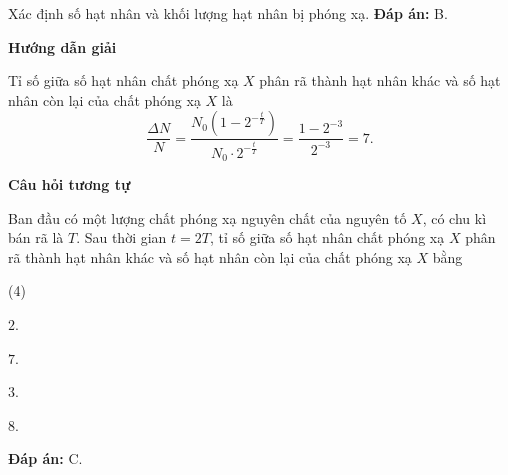 \begin{dang}{Xác định số hạt nhân và khối lượng hạt nhân bị phóng xạ.}
{		\textbf{Đáp án:} B.
	}
	{
		\begin{center}
			\textbf{Hướng dẫn giải}
		\end{center}
		
		Tỉ số giữa số hạt nhân chất phóng xạ $X$ phân rã thành hạt nhân khác và số hạt nhân còn lại của chất phóng xạ $X$ là
		\begin{equation*}
			\dfrac{\Delta N}{N}=\dfrac{N_0\left( 1-2^{-\frac{t}{T}}\right)}{N_0\cdot 2^{-\frac{t}{T}}}=\dfrac{1-2^{-3}}{2^{-3}}=7.
		\end{equation*}
		
		\begin{center}
			\textbf{Câu hỏi tương tự}
		\end{center}
		
		Ban đầu có một lượng chất phóng xạ nguyên chất của nguyên tố $X$, có chu kì bán rã là $T$. Sau thời gian $t=2T$, tỉ số giữa số hạt nhân chất phóng xạ $X$ phân rã thành hạt nhân khác và số hạt nhân còn lại của chất phóng xạ $X$ bằng
		\begin{mcq}(4)
			\item $2$.
			\item $7$.
			\item $3$.
			\item $8$.
		\end{mcq}
		
		\textbf{Đáp án:} C.}
	
\end{dang}

